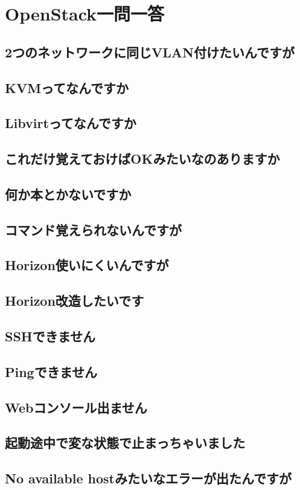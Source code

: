 \documentclass[9pt,b5paper,tombo,openany]{jsbook}
\begin{document}
\chapter{OpenStack一問一答}

\section*{2つのネットワークに同じVLAN付けたいんですが}
\section*{KVMってなんですか}
\section*{Libvirtってなんですか}
\section*{これだけ覚えておけばOKみたいなのありますか}
\section*{何か本とかないですか}
\section*{コマンド覚えられないんですが}
\section*{Horizon使いにくいんですが}
\section*{Horizon改造したいです}
\section*{SSHできません}
\section*{Pingできません}
\section*{Webコンソール出ません}
\section*{起動途中で変な状態で止まっちゃいました}
\section*{No available hostみたいなエラーが出たんですが}
\end{document}
